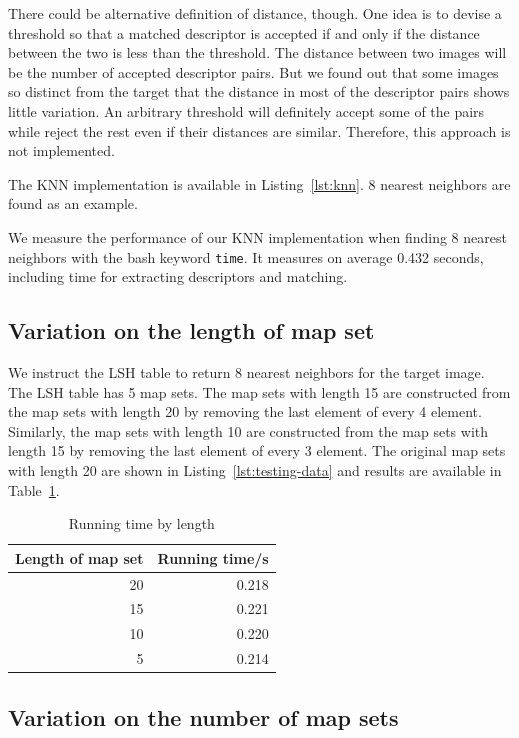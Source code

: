 \documentclass{ee208report}
\begin{document}
\begin{multicols*}{2}
There could be alternative definition of distance, though. One idea is to devise
a threshold so that a matched descriptor is accepted if and only if the distance
between the two is less than the threshold. The distance between two images will
be the number of accepted descriptor pairs. But we found out that some images so
distinct from the target that the distance in most of the descriptor pairs shows
little variation. An arbitrary threshold will definitely accept some of the
pairs while reject the rest even if their distances are similar. Therefore, this
approach is not implemented.

The KNN implementation is available in Listing~\ref{lst:knn}. 8 nearest
neighbors are found as an example.

We measure the performance of our KNN implementation when finding 8 nearest
neighbors with the bash keyword \texttt{time}. It measures on average 0.432
seconds, including time for extracting descriptors and matching.

\subsection{Variation on the length of map set}

We instruct the LSH table to return 8 nearest neighbors for the target image.
The LSH table has 5 map sets. The map sets with length 15 are constructed from
the map sets with length 20 by removing the last element of every 4 element.
Similarly, the map sets with length 10 are constructed from the map sets with
length 15 by removing the last element of every 3 element. The original map sets
with length 20 are shown in Listing~\ref{lst:testing-data} and results are
available in Table~\ref{tbl:time-by-length}.

\begin{table}[H]
    \centering
    \begin{tabular}{r r}
        \toprule
        Length of map set & Running time/s \\
        \midrule
        20 & 0.218 \\
        15 & 0.221 \\
        10 & 0.220 \\
        5 & 0.214 \\
        \bottomrule
    \end{tabular}
    \caption{Running time by length}
    \label{tbl:time-by-length}
\end{table}

\subsection{Variation on the number of map sets}


\end{multicols*}
\end{document}
